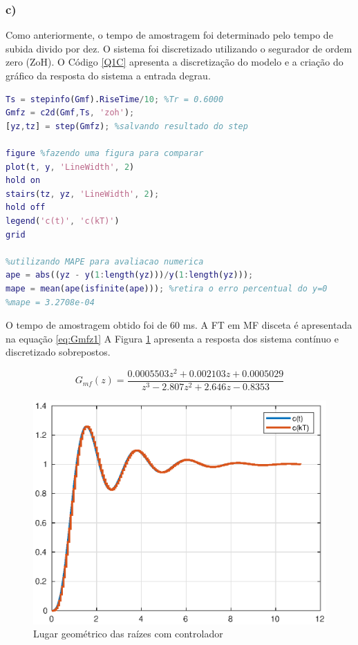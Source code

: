 \newpage    
\subsubsection*{c)}

    Como anteriormente, o tempo de amostragem foi determinado pelo tempo de subida divido por dez. 
    O sistema foi discretizado utilizando o segurador de ordem zero (ZoH). O Código \ref{Q1C} apresenta
    a discretização do modelo e a criação do gráfico da resposta do sistema a entrada degrau.

    \begin{lstlisting}[language=Matlab,label=Q1C,caption=Análise da estabilidade]
Ts = stepinfo(Gmf).RiseTime/10; %Tr = 0.6000
Gmfz = c2d(Gmf,Ts, 'zoh');
[yz,tz] = step(Gmfz); %salvando resultado do step

figure %fazendo uma figura para comparar
plot(t, y, 'LineWidth', 2)
hold on
stairs(tz, yz, 'LineWidth', 2);
hold off
legend('c(t)', 'c(kT)')
grid

%utilizando MAPE para avaliacao numerica
ape = abs((yz - y(1:length(yz)))/y(1:length(yz))); 
mape = mean(ape(isfinite(ape))); %retira o erro percentual do y=0
%mape = 3.2708e-04
    \end{lstlisting}

O tempo de amostragem obtido foi de 60 ms. A FT em MF disceta é apresentada na equação \ref{eq:Gmfz1}
A Figura \ref{fig:Stepctds} apresenta a resposta dos sistema
contínuo e discretizado sobrepostos. 

\begin{equation}
    G_{mf}(z) = \frac{0.0005503 z^2 + 0.002103 z + 0.0005029}{z^3 - 2.807 z^2 + 2.646 z - 0.8353}
    \label{eq:Gmfz1}
\end{equation}


\begin{figure}[!h]
    \centering
    \includegraphics[width = 0.75\linewidth]{Figuras/ProblemasPI/Problema1/resposta_ao_degrau.eps}
    \caption{Lugar geométrico das raízes com controlador}
    \label{fig:Stepctds}                   
\end{figure}

